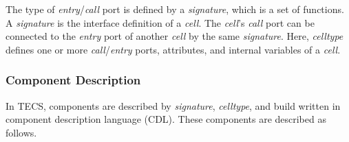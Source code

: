 \documentclass[S,R,E]{article/compsoft}
\begin{document}
The type of {\it entry}/{\it call} port is defined by a {\it signature}, which is a set of functions.
A {\it signature} is the interface definition of a {\it cell}.
The {\it cell}'s  {\it call} port can be connected to the {\it entry} port of another {\it cell} by the same {\it signature}.
Here, {\it celltype} defines one or more {\it call}/{\it entry} ports, attributes, and internal variables of a {\it cell}.


\subsubsection{Component Description}
In TECS, components are described by {\it signature}, {\it celltype}, and build written in component description language (CDL).
These components are described as follows.
\end{document}
